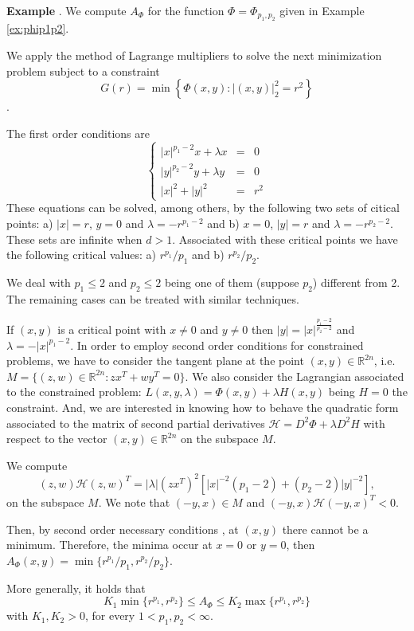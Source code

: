 \documentclass[twoside]{article}
\theoremstyle{remark}
\newcommand{\rr}{\mathbb{R}}
\renewcommand{\leq}{\leqslant}
\newcounter{example}
\newenvironment{example}{\noindent\textbf{Example \arabic{example}}.}{\addtocounter{example}{1}}
\begin{document}
\begin{example} We compute $A_{\Phi}$ for the function $\Phi=\Phi_{p_1,p_2}$ given in Example \eqref{ex:phip1p2}.

We apply the method of Lagrange multipliers to solve the next minimization problem subject to a constraint
\[
G(r)=\min\left\{\Phi(x,y):|(x,y)|_2^2=r^2\right\}\].

The first order conditions  are
\[
\left
\{
\begin{array}{ccc}
|x|^{p_1-2}x+ \lambda x&=&0
\\
|y|^{p_2-2}y+\lambda y&=&0
\\
|x|^2+|y|^2&=&r^2
\end{array}
\right.
\]
These equations can be solved, among others, by the following two sets  of citical points: 
a) $|x|=r$, $y=0$ and $\lambda=-r^{p_1-2}$ and b) $x=0$, $|y|=r$ and $\lambda=-r^{p_2-2}$. These sets are infinite when $d>1$. 
Associated with these critical points we have the following critical values: a) $r^{p_1}/p_1$ and b) $r^{p_2}/p_2$.

We deal with $p_1\leq 2$ and $p_2\leq 2$ being one of them (suppose $p_2$) different from 2. The remaining cases can be treated with similar techniques. 


If $(x,y)$ is a critical point with $x\neq 0$ and $y \neq 0$ then  $|y|=|x|^{\frac{p_1-2}{p_2-2}}$ and $\lambda=-|x|^{p_1-2}$.  In order to employ second order conditions for constrained problems,
we have to consider  the tangent plane at the point $(x,y)\in \rr^{2n}$, i.e. 
$M=\{(z,w) \in \rr^{2n}: zx^T+wy^T=0\}$. We also consider the Lagrangian associated to the constrained problem: $L(x,y,\lambda)=\Phi(x,y)+\lambda H(x,y)$ being $H=0$ the constraint.
And, we are interested in knowing how to behave the quadratic form associated to the matrix 
of second partial derivatives $\mathcal{H}=D^2 \Phi+ \lambda D^2 H$ 
with respect to the vector $(x,y)\in  \rr^{2n}$ 
on the subspace $M$.

 
We compute
\[(z,w)\mathcal{H}(z,w)^T=
|\lambda| (zx^T)^2 [|x|^{-2}(p_1-2)+(p_2-2)|y|^{-2}],\]
on the subspace $M$. We note that $(-y,x)\in M$ and $(-y,x)\mathcal{H}(-y,x)^T<0$.
 
Then, by second order necessary conditions \cite[p.333]{luenberger2015linear}, 
at $(x,y)$ there cannot be a minimum. Therefore, the minima occur at $x=0$ or $y=0$, then $A_{\Phi}(x,y)=\min\{r^{p_1}/p_1, r^{p_2}/p_2\}$. 

More generally, it holds that 
\[
K_1\min\{r^{p_1}, r^{p_2}\}\leq A_{\Phi}\leq K_2\max\{r^{p_1}, r^{p_2}\}
\]
with $K_1,K_2>0$, for every $1<p_1,p_2<\infty$. 
\end{example}
\end{document}
